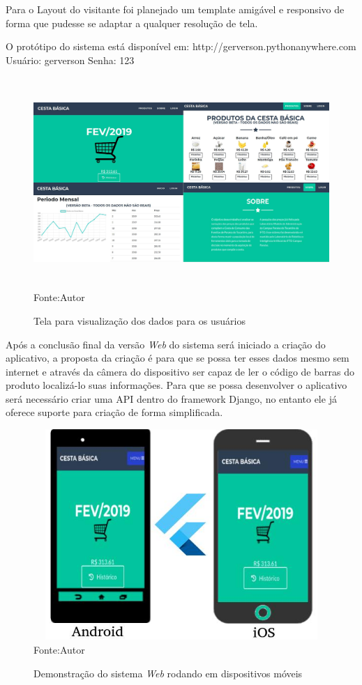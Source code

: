 \documentclass{ifto-tex}
\begin{document}
Para o Layout do visitante foi planejado um template amigável e responsivo de forma que pudesse se adaptar a qualquer resolução de tela.

O protótipo do sistema está disponível em: http://gerverson.pythonanywhere.com
Usuário: gerverson Senha: 123
\begin{figure}[!h]
	\begin{center}
		\includegraphics[width=16.0cm, height= 8.0cm]{cestauser.jpeg}    %
		Fonte:Autor
		\caption{Tela para visualização dos dados para os usuários} 
		\label{fig:faces}
	\end{center}
\end{figure}

Após a conclusão final da versão \textit{Web} do sistema será iniciado a criação do aplicativo, a proposta da criação é para que se possa ter esses dados mesmo sem internet e através da câmera do dispositivo ser capaz de ler o código de barras do produto localizá-lo suas informações.
Para que se possa desenvolver o aplicativo será necessário criar uma API dentro do framework Django, no entanto ele já oferece suporte para criação de forma simplificada.

\begin{figure}[!h]
	\begin{center}
		\includegraphics[width=12.0cm, height= 8.0cm]{cestadispositovos.jpeg}    %
		Fonte:Autor
		\caption{Demonstração do sistema \textit{Web} rodando em dispositivos móveis} 
		\label{fig:faces}
	\end{center}
\end{figure}
\end{document}
